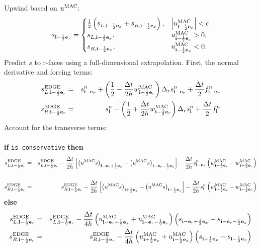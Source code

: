 Upwind based on $u^{\rm MAC}$:
\begin{equation}
s_{{\bf i}-\frac{1}{2}{\bf e}_x} =
\begin{cases}
\frac{1}{2}\left(s_{L,{\bf i}-\frac{1}{2}{\bf e}_x} + s_{R,{\bf i}-\frac{1}{2}{\bf e}_x}\right), & \left|u^{\rm MAC}_{{\bf i}-\frac{1}{2}{\bf e}_x}\right| < \epsilon \\
s_{L,{\bf i}-\frac{1}{2}{\bf e}_x}, & u^{\rm MAC}_{{\bf i}-\frac{1}{2}{\bf e}_x} > 0, \\
s_{R,{\bf i}-\frac{1}{2}{\bf e}_x}, & u^{\rm MAC}_{{\bf i}-\frac{1}{2}{\bf e}_x} < 0. \\
\end{cases}
\end{equation}
Predict $s$ to r-faces using a full-dimensional extrapolation.  First, the normal derivative and forcing terms:
\begin{eqnarray}
s_{L,{\bf i}-\frac{1}{2}{\bf e}_r}^{\rm EDGE} &=&  s_{{\bf i}-{\bf e}_r}^n + \left(\frac{1}{2} - \frac{\Delta t}{2h}w_{{\bf i}-\frac{1}{2}{\bf e}_r}^{\rm MAC}\right)\Delta_r s_{{\bf i}-{\bf e}_r}^n + \frac{\Delta t}{2}f_{{\bf i}-{\bf e}_r}^n \\
s_{R,{\bf i}-\frac{1}{2}{\bf e}_r}^{\rm EDGE} &=&  s_{{\bf i}}^n - \left(\frac{1}{2} + \frac{\Delta t}{2h}w_{{\bf i}-\frac{1}{2}{\bf e}_r}^{\rm MAC}\right)\Delta_r s_{{\bf i}}^n + \frac{\Delta t}{2}f_{{\bf i}}^n 
\end{eqnarray}
Account for the transverse terms:\\ \\
{\bf if} {\tt is\_conservative} {\bf then}
\begin{eqnarray}
s_{L,{\bf i}-\frac{1}{2}{\bf e}_r}^{\rm EDGE} &=& s_{L,{\bf i}-\frac{1}{2}{\bf e}_r}^{\rm EDGE} -
\frac{\Delta t}{2h}\left[\left(u^{\rm MAC}s\right)_{{\bf i}-{\bf e}_r+\frac{1}{2}{\bf e}_x} - \left(u^{\rm MAC}s\right)_{{\bf i}-{\bf e}_r-\frac{1}{2}{\bf e}_x}\right] - \frac{\Delta t}{2h}s_{{\bf i}-{\bf e}_r}^{n}\left(w_{{\bf i}-\frac{1}{2}{\bf e}_r}^{\rm MAC}-w_{{\bf i}-\frac{3}{2}{\bf e}_r}^{\rm MAC}\right)\nonumber\\
&& \\
s_{R,{\bf i}-\frac{1}{2}{\bf e}_r}^{\rm EDGE} &=& s_{R,{\bf i}-\frac{1}{2}{\bf e}_r}^{\rm EDGE} -
\frac{\Delta t}{2h}\left[\left(u^{\rm MAC}s\right)_{{\bf i}+\frac{1}{2}{\bf e}_x} - \left(u^{\rm MAC}s\right)_{{\bf i}-\frac{1}{2}{\bf e}_x}\right] - \frac{\Delta t}{2h}s_{{\bf i}}^{n}\left(w_{{\bf i}+\frac{1}{2}{\bf e}_r}^{\rm MAC}-w_{{\bf i}-\frac{1}{2}{\bf e}_r}^{\rm MAC}\right)
\end{eqnarray}
{\bf else}
\begin{eqnarray}
s_{L,{\bf i}-\frac{1}{2}{\bf e}_r}^{\rm EDGE} &=& s_{L,{\bf i}-\frac{1}{2}{\bf e}_r}^{\rm EDGE} -
\frac{\Delta t}{4h}\left(u^{\rm MAC}_{{\bf i}-{\bf e}_r+\frac{1}{2}{\bf e}_x} + u^{\rm MAC}_{{\bf i}-{\bf e}_r-\frac{1}{2}{\bf e}_x}\right)\left(s_{{\bf i}-{\bf e}_r+\frac{1}{2}{\bf e}_x} - s_{{\bf i}-{\bf e}_r-\frac{1}{2}{\bf e}_x}\right)\\
s_{R,{\bf i}-\frac{1}{2}{\bf e}_r}^{\rm EDGE} &=& s_{R,{\bf i}-\frac{1}{2}{\bf e}_r}^{\rm EDGE} -
\frac{\Delta t}{4h}\left(u^{\rm MAC}_{{\bf i}+\frac{1}{2}{\bf e}_x} + u^{\rm MAC}_{{\bf i}-\frac{1}{2}{\bf e}_x}\right)\left(s_{{\bf i}+\frac{1}{2}{\bf e}_x} - s_{{\bf i}-\frac{1}{2}{\bf e}_x}\right)
\end{eqnarray}
